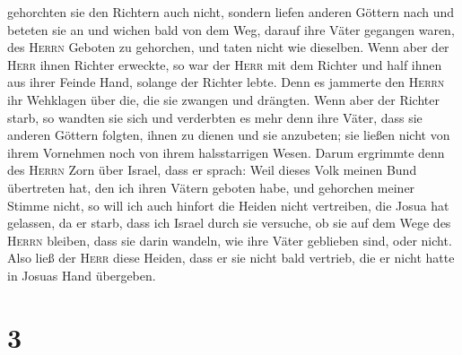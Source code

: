 gehorchten sie den Richtern auch nicht, sondern liefen anderen Göttern
nach und beteten sie an und wichen bald von dem Weg, darauf ihre Väter
gegangen waren, des \textsc{Herrn} Geboten zu gehorchen, und taten nicht
wie dieselben.  Wenn aber der \textsc{Herr} ihnen Richter
erweckte, so war der \textsc{Herr} mit dem Richter und half ihnen aus
ihrer Feinde Hand, solange der Richter lebte. Denn es jammerte den
\textsc{Herrn} ihr Wehklagen über die, die sie zwangen und drängten.
 Wenn aber der Richter starb, so wandten sie sich und
verderbten es mehr denn ihre Väter, dass sie anderen Göttern folgten,
ihnen zu dienen und sie anzubeten; sie ließen nicht von ihrem Vornehmen
noch von ihrem halsstarrigen Wesen.  Darum ergrimmte denn
des \textsc{Herrn} Zorn über Israel, dass er sprach: Weil dieses Volk
meinen Bund übertreten hat, den ich ihren Vätern geboten habe, und
gehorchen meiner Stimme nicht,  so will ich auch hinfort
die Heiden nicht vertreiben, die Josua hat gelassen, da er starb,
 dass ich Israel durch sie versuche, ob sie auf dem Wege
des \textsc{Herrn} bleiben, dass sie darin wandeln, wie ihre Väter
geblieben sind, oder nicht.  Also ließ der \textsc{Herr}
diese Heiden, dass er sie nicht bald vertrieb, die er nicht hatte in
Josuas Hand übergeben.

\hypertarget{section-2}{%
\section{3}\label{section-2}}

